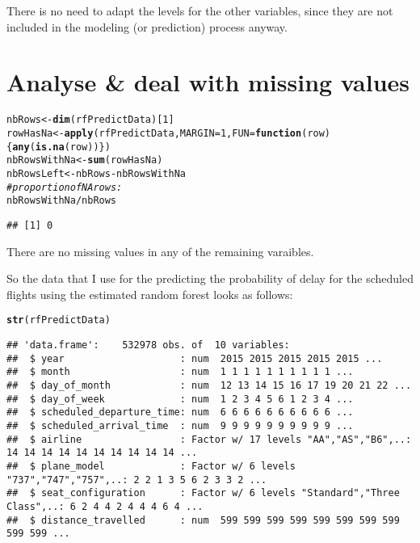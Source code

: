 \documentclass{article}\usepackage[]{graphicx}\usepackage[]{color}
\makeatletter
\newcommand{\hlnum}[1]{\textcolor[rgb]{0.686,0.059,0.569}{#1}}%
\newcommand{\hlcom}[1]{\textcolor[rgb]{0.678,0.584,0.686}{\textit{#1}}}%
\newcommand{\hlopt}[1]{\textcolor[rgb]{0,0,0}{#1}}%
\newcommand{\hlstd}[1]{\textcolor[rgb]{0.345,0.345,0.345}{#1}}%
\newcommand{\hlkwa}[1]{\textcolor[rgb]{0.161,0.373,0.58}{\textbf{#1}}}%
\newcommand{\hlkwb}[1]{\textcolor[rgb]{0.69,0.353,0.396}{#1}}%
\newcommand{\hlkwc}[1]{\textcolor[rgb]{0.333,0.667,0.333}{#1}}%
\newcommand{\hlkwd}[1]{\textcolor[rgb]{0.737,0.353,0.396}{\textbf{#1}}}%
\newenvironment{kframe}{%
 \def\at@end@of@kframe{}%
 \ifinner\ifhmode%
  \def\at@end@of@kframe{\end{minipage}}%
  \begin{minipage}{\columnwidth}%
 \fi\fi%
 \def\FrameCommand##1{\hskip\@totalleftmargin \hskip-\fboxsep
 \colorbox{shadecolor}{##1}\hskip-\fboxsep
     \hskip-\linewidth \hskip-\@totalleftmargin \hskip\columnwidth}%
 \MakeFramed {\advance\hsize-\width
   \@totalleftmargin\z@ \linewidth\hsize
   \@setminipage}}%
 {\par\unskip\endMakeFramed%
 \at@end@of@kframe}
\newenvironment{knitrout}{}{} %
\makeatother
\begin{document}
There is no need to adapt the levels for the other variables, since they are not included in the modeling (or prediction) process anyway.

\section{Analyse \& deal with missing values}

\begin{knitrout}
\color{fgcolor}\begin{kframe}
\begin{alltt}
\hlstd{nbRows} \hlkwb{<-} \hlkwd{dim}\hlstd{(rfPredictData)[}\hlnum{1}\hlstd{]}
\hlstd{rowHasNa} \hlkwb{<-} \hlkwd{apply}\hlstd{(rfPredictData,} \hlkwc{MARGIN}\hlstd{=}\hlnum{1}\hlstd{,} \hlkwc{FUN}\hlstd{=}\hlkwa{function}\hlstd{(}\hlkwc{row}\hlstd{)\{} \hlkwd{any}\hlstd{(}\hlkwd{is.na}\hlstd{(row)) \})}
\hlstd{nbRowsWithNa} \hlkwb{<-} \hlkwd{sum}\hlstd{(rowHasNa)}
\hlstd{nbRowsLeft} \hlkwb{<-} \hlstd{nbRows} \hlopt{-} \hlstd{nbRowsWithNa}
\hlcom{# proportion of NA rows:}
\hlstd{nbRowsWithNa} \hlopt{/} \hlstd{nbRows}
\end{alltt}
\begin{verbatim}
## [1] 0
\end{verbatim}
\end{kframe}
\end{knitrout}

There are no missing values in any of the remaining varaibles.

So the data that I use for the predicting the probability of delay for the scheduled flights using the estimated random forest looks as follows:
\begin{knitrout}
\color{fgcolor}\begin{kframe}
\begin{alltt}
\hlkwd{str}\hlstd{(rfPredictData)}
\end{alltt}
\begin{verbatim}
## 'data.frame':	532978 obs. of  10 variables:
##  $ year                    : num  2015 2015 2015 2015 2015 ...
##  $ month                   : num  1 1 1 1 1 1 1 1 1 1 ...
##  $ day_of_month            : num  12 13 14 15 16 17 19 20 21 22 ...
##  $ day_of_week             : num  1 2 3 4 5 6 1 2 3 4 ...
##  $ scheduled_departure_time: num  6 6 6 6 6 6 6 6 6 6 ...
##  $ scheduled_arrival_time  : num  9 9 9 9 9 9 9 9 9 9 ...
##  $ airline                 : Factor w/ 17 levels "AA","AS","B6",..: 14 14 14 14 14 14 14 14 14 14 ...
##  $ plane_model             : Factor w/ 6 levels "737","747","757",..: 2 2 1 3 5 6 2 3 3 2 ...
##  $ seat_configuration      : Factor w/ 6 levels "Standard","Three Class",..: 6 2 4 4 2 4 4 4 6 4 ...
##  $ distance_travelled      : num  599 599 599 599 599 599 599 599 599 599 ...
\end{verbatim}
\end{kframe}
\end{knitrout}
\end{document}
